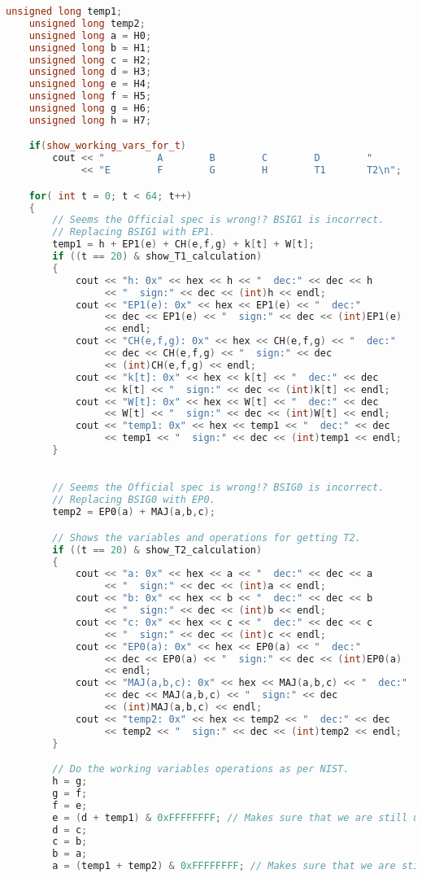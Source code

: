 \begin{lstlisting}[language = C++]
	unsigned long temp1;
	unsigned long temp2;
	unsigned long a = H0;
	unsigned long b = H1;
	unsigned long c = H2;
	unsigned long d = H3;
	unsigned long e = H4;
	unsigned long f = H5;
	unsigned long g = H6;
	unsigned long h = H7;

	if(show_working_vars_for_t)
		cout << "         A        B        C        D        "
		     << "E        F        G        H        T1       T2\n";

	for( int t = 0; t < 64; t++)
	{
		// Seems the Official spec is wrong!? BSIG1 is incorrect.
		// Replacing BSIG1 with EP1.
		temp1 = h + EP1(e) + CH(e,f,g) + k[t] + W[t];
		if ((t == 20) & show_T1_calculation)
		{
			cout << "h: 0x" << hex << h << "  dec:" << dec << h 
			     << "  sign:" << dec << (int)h << endl;
			cout << "EP1(e): 0x" << hex << EP1(e) << "  dec:" 
			     << dec << EP1(e) << "  sign:" << dec << (int)EP1(e) 
			     << endl;
			cout << "CH(e,f,g): 0x" << hex << CH(e,f,g) << "  dec:" 
			     << dec << CH(e,f,g) << "  sign:" << dec 
			     << (int)CH(e,f,g) << endl;
			cout << "k[t]: 0x" << hex << k[t] << "  dec:" << dec 
			     << k[t] << "  sign:" << dec << (int)k[t] << endl;
			cout << "W[t]: 0x" << hex << W[t] << "  dec:" << dec 
			     << W[t] << "  sign:" << dec << (int)W[t] << endl;
			cout << "temp1: 0x" << hex << temp1 << "  dec:" << dec 
			     << temp1 << "  sign:" << dec << (int)temp1 << endl;
		}
		

		// Seems the Official spec is wrong!? BSIG0 is incorrect.
		// Replacing BSIG0 with EP0.
		temp2 = EP0(a) + MAJ(a,b,c);

		// Shows the variables and operations for getting T2.
		if ((t == 20) & show_T2_calculation)
		{
			cout << "a: 0x" << hex << a << "  dec:" << dec << a 
			     << "  sign:" << dec << (int)a << endl;
			cout << "b: 0x" << hex << b << "  dec:" << dec << b 
			     << "  sign:" << dec << (int)b << endl;
			cout << "c: 0x" << hex << c << "  dec:" << dec << c 
			     << "  sign:" << dec << (int)c << endl;
			cout << "EP0(a): 0x" << hex << EP0(a) << "  dec:" 
			     << dec << EP0(a) << "  sign:" << dec << (int)EP0(a) 
			     << endl;
			cout << "MAJ(a,b,c): 0x" << hex << MAJ(a,b,c) << "  dec:" 
			     << dec << MAJ(a,b,c) << "  sign:" << dec 
			     << (int)MAJ(a,b,c) << endl;
			cout << "temp2: 0x" << hex << temp2 << "  dec:" << dec 
			     << temp2 << "  sign:" << dec << (int)temp2 << endl;
		}

		// Do the working variables operations as per NIST.
		h = g;
		g = f;
		f = e;
		e = (d + temp1) & 0xFFFFFFFF; // Makes sure that we are still using 32 bits.
		d = c;
		c = b;
		b = a;
		a = (temp1 + temp2) & 0xFFFFFFFF; // Makes sure that we are still using 32 bits.


\end{lstlisting}
